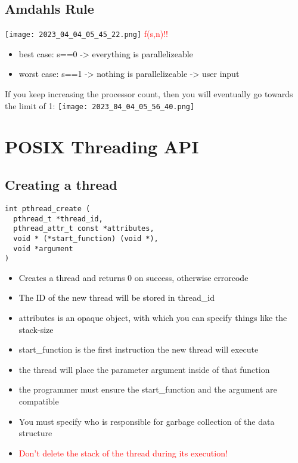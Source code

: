 \documentclass[main.tex,fontsize=8pt,paper=a4,paper=portrait,DIV=calc,]{scrartcl}
\begin{document}
\subsection{Amdahls Rule}
\texttt{[image: 2023\_04\_04\_05\_45\_22.png]}\newline
\textcolor{red}{f(s,n)!!}
\begin{itemize}
\item \textcolor{black}{best case: s==0 -> everything is parallelizeable}
\item \textcolor{black}{worst case: s==1 -> nothing is parallelizeable -> user input}
\end{itemize} 
If you keep increasing the processor count, then you will eventually go towards the limit of 1:\newline
\texttt{[image: 2023\_04\_04\_05\_56\_40.png]}


\section{POSIX Threading API}
\subsection{Creating a thread}
\begin{lstlisting}
int pthread_create (
  pthread_t *thread_id,
  pthread_attr_t const *attributes,
  void * (*start_function) (void *),
  void *argument
)
\end{lstlisting}
\begin{itemize}
\item \textcolor{black}{Creates a thread and returns 0 on success, otherwise errorcode}
\item \textcolor{black}{The ID of the new thread will be stored in thread\_id}
\item \textcolor{black}{attributes is an opaque object, with which you can specify things like the stack-size}
\item start\_function is the first instruction the new thread will execute
\item the thread will place the parameter argument inside of that function
\item the programmer must ensure the start\_function and the argument are compatible
\item You must specify who is responsible for garbage collection of the data structure
\item \textcolor{red}{Don't delete the stack of the thread during its execution!}
\end{itemize} 
\end{document}
